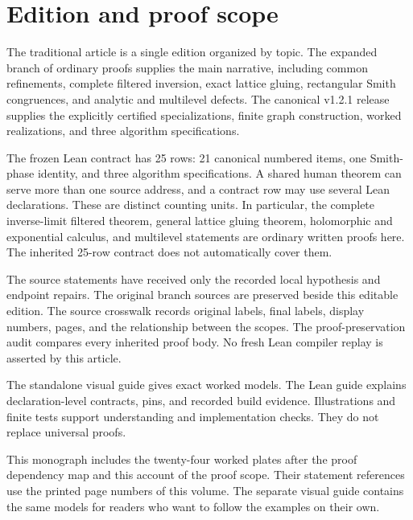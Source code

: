 \section{Edition and proof scope}\label{sec:edition-scope}
The traditional article is a single edition organized by topic.  The expanded branch of ordinary proofs supplies the main narrative, including common refinements, complete filtered inversion, exact lattice gluing, rectangular Smith congruences, and analytic and multilevel defects.  The canonical v1.2.1 release supplies the explicitly certified specializations, finite graph construction, worked realizations, and three algorithm specifications.

The frozen Lean contract has 25 rows: 21 canonical numbered items, one Smith-phase identity, and three algorithm specifications.  A shared human theorem can serve more than one source address, and a contract row may use several Lean declarations.  These are distinct counting units.  In particular, the complete inverse-limit filtered theorem, general lattice gluing theorem, holomorphic and exponential calculus, and multilevel statements are ordinary written proofs here. The inherited 25-row contract does not automatically cover them.

The source statements have received only the recorded local hypothesis and endpoint repairs.  The original branch sources are preserved beside this editable edition.  The source crosswalk records original labels, final labels, display numbers, pages, and the relationship between the scopes.  The proof-preservation audit compares every inherited proof body.  No fresh Lean compiler replay is asserted by this article.

The standalone visual guide gives exact worked models.  The Lean guide explains declaration-level contracts, pins, and recorded build evidence.  Illustrations and finite tests support understanding and implementation checks. They do not replace universal proofs.

This monograph includes the twenty-four worked plates after the proof dependency map and this account of the proof scope. Their statement references use the printed page numbers of this volume. The separate visual guide contains the same models for readers who want to follow the examples on their own.
